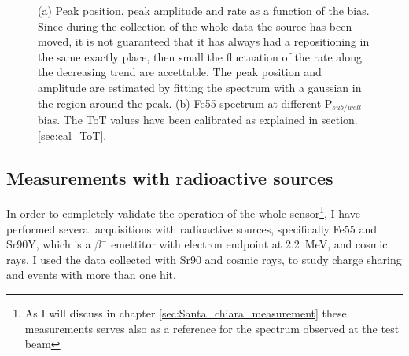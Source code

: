 \begin{figure}
\begin{subfigure}[b]{0.49\textwidth}
                \caption{}
                \label{fig:}
            \end{subfigure}
            \caption{(a) Peak position, peak amplitude and rate as a function of the bias. Since during the collection of the whole data the source has been moved, it is not guaranteed that it has always had a repositioning in the same exactly place, then small the fluctuation of the rate along the decreasing trend are accettable. The peak position and amplitude are estimated by fitting the spectrum with a gaussian in the region around the peak. (b) Fe55 spectrum at different P$_{sub/well}$ bias. The ToT values have been calibrated as explained in section. \ref{sec:cal_ToT}.}
            \label{fig:Fe_param_vs_bias}
            \end{figure}     

    \subsection{Measurements with radioactive sources}
        In order to completely validate the operation of the whole sensor\footnote{As I will discuss in chapter \ref{sec:Santa_chiara_measurement} these measurements serves also as a reference for the spectrum observed at the test beam}, I have performed several acquisitions with radioactive sources, specifically Fe55 and Sr90Y, which is a $\beta^-$ emettitor with electron endpoint at \SI{2.2}{MeV}, and cosmic rays.
        I used the data collected with Sr90 and cosmic rays, to study charge sharing and events with more than one hit.

